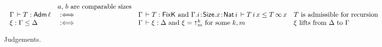 \begin{figure}[htbp]
\[\begin{array}{l@{\quad}l@{\quad}l@{~}l@{~~}l}
    & \mbox{$a$, $b$ are comparable sizes} \\
  \Gamma \der T : \Adm \ell & \defas &
     \multicolumn 2 {@{}l@{\quad}}
       {\Gamma \der T : \FixK \mand \Gamma.i\of\Size.x\of\Nat i \der T\,i\,x \leq T\,\infty\,x}
    & \mbox{%
            $T$ is admissible for recursion} \\
  \xi : \Gamma \leq \Delta & \defas &
     \multicolumn 2 {@{}l@{\quad}}
       {\Gamma \der \xi : \Delta \mand \xi = \slift^k_m \mforsome k,m}
    & \mbox{$\xi$ lifts from $\Delta$ to $\Gamma$}
\end{array}
\]
\vspace{-2ex}
  \caption{Judgements.}
  \label{fig:judge}
\end{figure}

